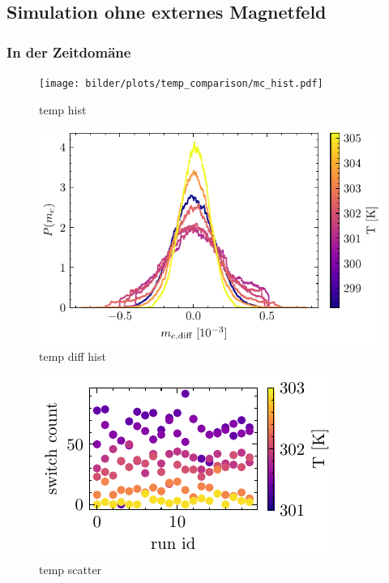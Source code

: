 \documentclass[main.tex]{subfiles}
\begin{document}
\subsection{Simulation ohne externes Magnetfeld}
\subsubsection{In der Zeitdomäne}

\begin{figure}[H]
    \centering
    \texttt{[image: bilder/plots/temp\_comparison/mc\_hist.pdf]}
    \caption{temp hist}\label{fig:temp-hist}    
\end{figure}

\begin{figure}[H]
    \centering
    \includegraphics{bilder/plots/temp_comparison_long/mc_diff_hist.pdf}
    \caption{temp diff hist}\label{fig:temp-diff-hist}    
\end{figure}

\begin{figure}[H]
    \centering
    \includegraphics{bilder/plots/temp_comparison/switch_count_scatter.pdf}
    \caption{temp scatter}\label{fig:temp-scatter}
\end{figure}
\end{document}
